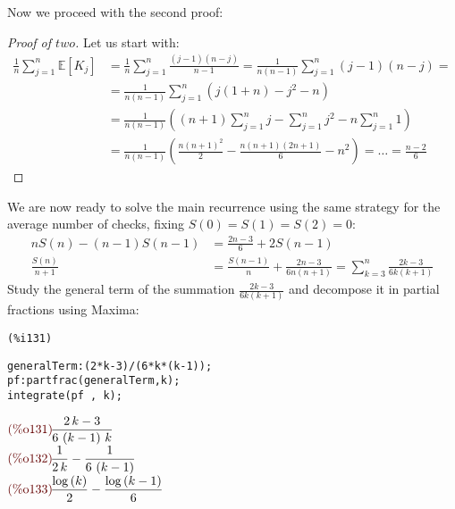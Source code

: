Now we proceed with the second proof:
\begin{proof}[Proof of $two$]
  Let us start with:
  \begin{displaymath}
    \begin{split}
      \frac{1}{n}\sum_{j=1}^{n}{\mathbb{E} \left[K_j \right] } &=
      \frac{1}{n} \sum_{j=1}^{n}{\frac{(j-1)(n-j)}{n-1}} =
      \frac{1}{n(n-1)} \sum_{j=1}^{n}{(j-1)(n-j)}=\\
      &=\frac{1}{n(n-1)} \sum_{j=1}^{n}{(j(1+n)-j^2-n)} \\
      &=\frac{1}{n(n-1)} \left( (n+1)\sum_{j=1}^{n}{j} -
        \sum_{j=1}^{n}{j^2} -n \sum_{j=1}^{n}{1}  \right)\\
      &=\frac{1}{n(n-1)}\left( \frac{n(n+1)^2}{2} -
        \frac{n(n+1)(2n+1)}{6} - n^2 \right) = \ldots =  \frac{n-2}{6} 
    \end{split}
  \end{displaymath} 
\end{proof}

We are now ready to solve the main recurrence using the same strategy
for the average number of checks, fixing $S(0) = S(1) = S(2) =
0$:
\begin{displaymath}
  \begin{split}
    nS(n) - (n-1)S(n-1) &=  \frac{2n-3}{6} + 2S(n-1)\\
    \frac{S(n)}{n+1} &=  \frac{S(n-1)}{n} +  \frac{2n -3}{6n(n+1)} =
      \sum_{k=3}^{n}{ \frac{2k-3}{6k(k+1)} }  
  \end{split}
\end{displaymath}
Study the general term of the summation $ \frac{2k-3}{6k(k+1)}$ and
decompose it in partial fractions using Maxima:\\
\noindent
\begin{minipage}[t]{8ex}{\color{red}\bf
\begin{verbatim}
(%i131) 
\end{verbatim}}
\end{minipage}
\begin{minipage}[t]{\textwidth}{\color{blue}
\begin{verbatim}
generalTerm:(2*k-3)/(6*k*(k-1));
pf:partfrac(generalTerm,k);
integrate(pf , k);
\end{verbatim}}
\end{minipage}
\begin{math}\displaystyle
\parbox{8ex}{\color{labelcolor}(\%o131) }
\frac{2\,k-3}{6\,\left( k-1\right) \,k}
\end{math}\\
\begin{math}\displaystyle
\parbox{8ex}{\color{labelcolor}(\%o132) }
\frac{1}{2\,k}-\frac{1}{6\,\left( k-1\right) }
\end{math}\\
\begin{math}\displaystyle
\parbox{8ex}{\color{labelcolor}(\%o133) }
\frac{\mathrm{log}\left( k\right) }{2}-\frac{\mathrm{log}\left( k-1\right) }{6}
\end{math}

